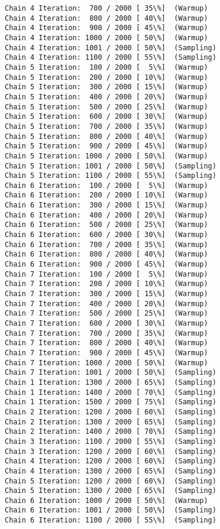 \documentclass[11pt]{article}
\begin{document}
\begin{Verbatim}[commandchars=\\\{\}]
Chain 4 Iteration:  700 / 2000 [ 35\%]  (Warmup)
Chain 4 Iteration:  800 / 2000 [ 40\%]  (Warmup)
Chain 4 Iteration:  900 / 2000 [ 45\%]  (Warmup)
Chain 4 Iteration: 1000 / 2000 [ 50\%]  (Warmup)
Chain 4 Iteration: 1001 / 2000 [ 50\%]  (Sampling)
Chain 4 Iteration: 1100 / 2000 [ 55\%]  (Sampling)
Chain 5 Iteration:  100 / 2000 [  5\%]  (Warmup)
Chain 5 Iteration:  200 / 2000 [ 10\%]  (Warmup)
Chain 5 Iteration:  300 / 2000 [ 15\%]  (Warmup)
Chain 5 Iteration:  400 / 2000 [ 20\%]  (Warmup)
Chain 5 Iteration:  500 / 2000 [ 25\%]  (Warmup)
Chain 5 Iteration:  600 / 2000 [ 30\%]  (Warmup)
Chain 5 Iteration:  700 / 2000 [ 35\%]  (Warmup)
Chain 5 Iteration:  800 / 2000 [ 40\%]  (Warmup)
Chain 5 Iteration:  900 / 2000 [ 45\%]  (Warmup)
Chain 5 Iteration: 1000 / 2000 [ 50\%]  (Warmup)
Chain 5 Iteration: 1001 / 2000 [ 50\%]  (Sampling)
Chain 5 Iteration: 1100 / 2000 [ 55\%]  (Sampling)
Chain 6 Iteration:  100 / 2000 [  5\%]  (Warmup)
Chain 6 Iteration:  200 / 2000 [ 10\%]  (Warmup)
Chain 6 Iteration:  300 / 2000 [ 15\%]  (Warmup)
Chain 6 Iteration:  400 / 2000 [ 20\%]  (Warmup)
Chain 6 Iteration:  500 / 2000 [ 25\%]  (Warmup)
Chain 6 Iteration:  600 / 2000 [ 30\%]  (Warmup)
Chain 6 Iteration:  700 / 2000 [ 35\%]  (Warmup)
Chain 6 Iteration:  800 / 2000 [ 40\%]  (Warmup)
Chain 6 Iteration:  900 / 2000 [ 45\%]  (Warmup)
Chain 7 Iteration:  100 / 2000 [  5\%]  (Warmup)
Chain 7 Iteration:  200 / 2000 [ 10\%]  (Warmup)
Chain 7 Iteration:  300 / 2000 [ 15\%]  (Warmup)
Chain 7 Iteration:  400 / 2000 [ 20\%]  (Warmup)
Chain 7 Iteration:  500 / 2000 [ 25\%]  (Warmup)
Chain 7 Iteration:  600 / 2000 [ 30\%]  (Warmup)
Chain 7 Iteration:  700 / 2000 [ 35\%]  (Warmup)
Chain 7 Iteration:  800 / 2000 [ 40\%]  (Warmup)
Chain 7 Iteration:  900 / 2000 [ 45\%]  (Warmup)
Chain 7 Iteration: 1000 / 2000 [ 50\%]  (Warmup)
Chain 7 Iteration: 1001 / 2000 [ 50\%]  (Sampling)
Chain 1 Iteration: 1300 / 2000 [ 65\%]  (Sampling)
Chain 1 Iteration: 1400 / 2000 [ 70\%]  (Sampling)
Chain 1 Iteration: 1500 / 2000 [ 75\%]  (Sampling)
Chain 2 Iteration: 1200 / 2000 [ 60\%]  (Sampling)
Chain 2 Iteration: 1300 / 2000 [ 65\%]  (Sampling)
Chain 2 Iteration: 1400 / 2000 [ 70\%]  (Sampling)
Chain 3 Iteration: 1100 / 2000 [ 55\%]  (Sampling)
Chain 3 Iteration: 1200 / 2000 [ 60\%]  (Sampling)
Chain 4 Iteration: 1200 / 2000 [ 60\%]  (Sampling)
Chain 4 Iteration: 1300 / 2000 [ 65\%]  (Sampling)
Chain 5 Iteration: 1200 / 2000 [ 60\%]  (Sampling)
Chain 5 Iteration: 1300 / 2000 [ 65\%]  (Sampling)
Chain 6 Iteration: 1000 / 2000 [ 50\%]  (Warmup)
Chain 6 Iteration: 1001 / 2000 [ 50\%]  (Sampling)
Chain 6 Iteration: 1100 / 2000 [ 55\%]  (Sampling)

\end{Verbatim}
\end{document}
